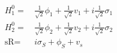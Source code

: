 \begin{align} 
H_1^0 = & \, \frac{1}{\sqrt{2}} \phi_1  + \frac{1}{\sqrt{2}} v_1  + i \frac{1}{\sqrt{2}} \sigma_1 \\ 
H_2^0 = & \, \frac{1}{\sqrt{2}} \phi_2  + \frac{1}{\sqrt{2}} v_2  + i \frac{1}{\sqrt{2}} \sigma_2 \\ 
\text{sR} = & \, i \sigma_S  + \phi_S + v_s
\end{align} 
